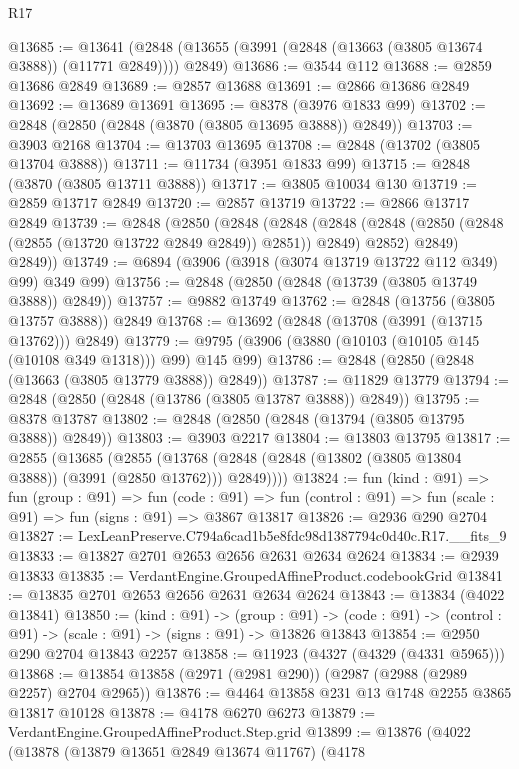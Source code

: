 \begin{lexlean}{R17}
\begin{coremodule}
@13685 := @13641 (@2848 (@13655 (@3991 (@2848 (@13663 (@3805 @13674 @3888)) (@11771 @2849)))) @2849)
@13686 := @3544 @112
@13688 := @2859 @13686 @2849
@13689 := @2857 @13688
@13691 := @2866 @13686 @2849
@13692 := @13689 @13691
@13695 := @8378 (@3976 @1833 @99)
@13702 := @2848 (@2850 (@2848 (@3870 (@3805 @13695 @3888)) @2849))
@13703 := @3903 @2168
@13704 := @13703 @13695
@13708 := @2848 (@13702 (@3805 @13704 @3888))
@13711 := @11734 (@3951 @1833 @99)
@13715 := @2848 (@3870 (@3805 @13711 @3888))
@13717 := @3805 @10034 @130
@13719 := @2859 @13717 @2849
@13720 := @2857 @13719
@13722 := @2866 @13717 @2849
@13739 := @2848
    (@2850
      (@2848
        (@2848
          (@2848 (@2848 (@2850 (@2848 (@2855 (@13720 @13722 @2849 @2849)) @2851)) @2849) @2852)
          @2849)
        @2849))
@13749 := @6894 (@3906 (@3918 (@3074 @13719 @13722 @112 @349) @99) @349 @99)
@13756 := @2848 (@2850 (@2848 (@13739 (@3805 @13749 @3888)) @2849))
@13757 := @9882 @13749
@13762 := @2848 (@13756 (@3805 @13757 @3888)) @2849
@13768 := @13692 (@2848 (@13708 (@3991 (@13715 @13762))) @2849)
@13779 := @9795 (@3906 (@3880 (@10103 (@10105 @145 (@10108 @349 @1318))) @99) @145 @99)
@13786 := @2848 (@2850 (@2848 (@13663 (@3805 @13779 @3888)) @2849))
@13787 := @11829 @13779
@13794 := @2848 (@2850 (@2848 (@13786 (@3805 @13787 @3888)) @2849))
@13795 := @8378 @13787
@13802 := @2848 (@2850 (@2848 (@13794 (@3805 @13795 @3888)) @2849))
@13803 := @3903 @2217
@13804 := @13803 @13795
@13817 := @2855
    (@13685
      (@2855 (@13768 (@2848 (@2848 (@13802 (@3805 @13804 @3888)) (@3991 (@2850 @13762))) @2849))))
@13824 := fun (kind : @91) =>
  fun (group : @91) =>
  fun (code : @91) => fun (control : @91) => fun (scale : @91) => fun (signs : @91) => @3867 @13817
@13826 := @2936 @290 @2704
@13827 := LexLeanPreserve.C794a6cad1b5e8fdc98d1387794c0d40c.R17.__fits_9
@13833 := @13827 @2701 @2653 @2656 @2631 @2634 @2624
@13834 := @2939 @13833
@13835 := VerdantEngine.GroupedAffineProduct.codebookGrid
@13841 := @13835 @2701 @2653 @2656 @2631 @2634 @2624
@13843 := @13834 (@4022 @13841)
@13850 := (kind : @91) ->
  (group : @91) ->
  (code : @91) -> (control : @91) -> (scale : @91) -> (signs : @91) -> @13826 @13843
@13854 := @2950 @290 @2704 @13843 @2257
@13858 := @11923 (@4327 (@4329 (@4331 @5965)))
@13868 := @13854 @13858 (@2971 (@2981 @290)) (@2987 (@2988 (@2989 @2257) @2704 @2965))
@13876 := @4464 @13858 @231 @13 @1748 @2255 @3865 @13817 @10128
@13878 := @4178 @6270 @6273
@13879 := VerdantEngine.GroupedAffineProduct.Step.grid
@13899 := @13876
    (@4022
      (@13878
        (@13879 @13651 @2849 @13674 @11767)
        (@4178

\end{coremodule}
\end{lexlean}
